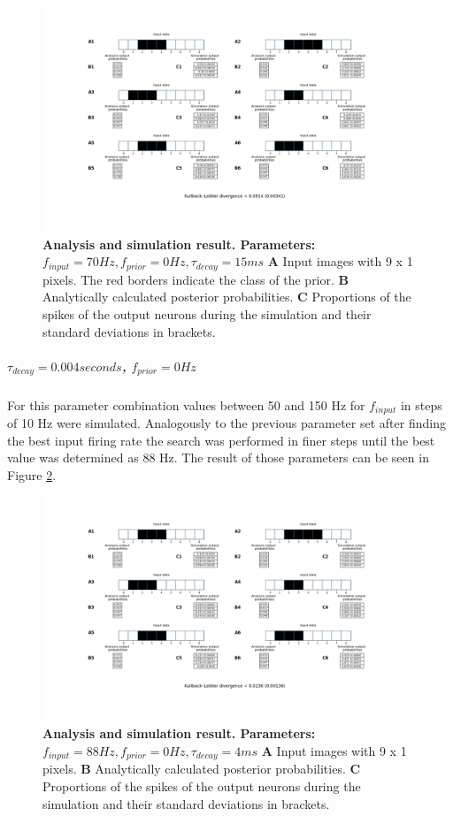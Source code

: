 \begin{figure}
  \includegraphics[width=\linewidth]{figures/1D/1D_70_0_15.png}
  \caption{\textbf{Analysis and simulation result. Parameters: }$f_{input} = 70 Hz, f_{prior} = 0 Hz, \tau_{decay} = 15 ms$ \textbf{A} Input images with 9 x 1 pixels. The red borders indicate the class of the prior. \textbf{B} Analytically calculated posterior probabilities. \textbf{C} Proportions of the spikes of the output neurons during the simulation and their standard deviations in brackets.}
  \label{fig:1D_70_0_15}
\end{figure}

\subparagraph{$\tau_{decay} = 0.004 seconds$, $f_{prior} = 0 Hz$}
For this parameter combination values between 50 and 150 Hz for $f_{input}$ in steps of 10 Hz were simulated. Analogously to the previous parameter set after finding the best input firing rate the search was performed in finer steps until the best value was determined as 88 Hz. The result of those parameters can be seen in Figure \ref{fig:1D_88_0_4}.

\begin{figure}
  \includegraphics[width=\linewidth]{figures/1D/1D_88_0_4.png}
  \caption{\textbf{Analysis and simulation result. Parameters: } $f_{input} = 88 Hz, f_{prior} = 0 Hz, \tau_{decay} = 4 ms$ \textbf{A} Input images with 9 x 1 pixels. \textbf{B} Analytically calculated posterior probabilities. \textbf{C} Proportions of the spikes of the output neurons during the simulation and their standard deviations in brackets.}
  \label{fig:1D_88_0_4}
\end{figure}

